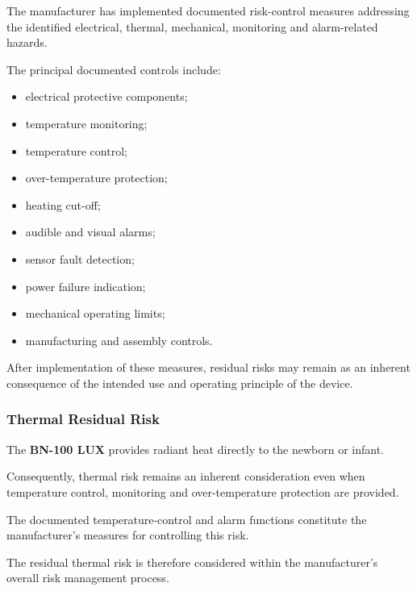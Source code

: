 The manufacturer has implemented documented risk-control measures addressing
the identified electrical, thermal, mechanical, monitoring and alarm-related
hazards.

The principal documented controls include:

\begin{itemize}

    \item electrical protective components;

    \item temperature monitoring;

    \item temperature control;

    \item over-temperature protection;

    \item heating cut-off;

    \item audible and visual alarms;

    \item sensor fault detection;

    \item power failure indication;

    \item mechanical operating limits;

    \item manufacturing and assembly controls.

\end{itemize}

After implementation of these measures, residual risks may remain as an
inherent consequence of the intended use and operating principle of the
device.

\subsubsection{Thermal Residual Risk}

The \textbf{BN-100 LUX} provides radiant heat directly to the newborn or
infant.

Consequently, thermal risk remains an inherent consideration even when
temperature control, monitoring and over-temperature protection are
provided.

The documented temperature-control and alarm functions constitute the
manufacturer's measures for controlling this risk.

The residual thermal risk is therefore considered within the manufacturer's
overall risk management process.

